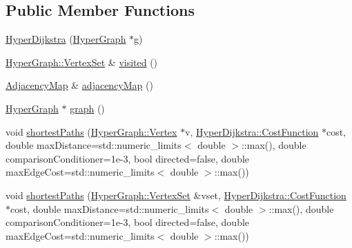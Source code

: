 \subsection*{Public Member Functions}
\begin{DoxyCompactItemize}
\item 
\mbox{\hyperlink{structg2o_1_1_hyper_dijkstra_a55e844f4b596290cb36a0d9fe4140966}{Hyper\+Dijkstra}} (\mbox{\hyperlink{classg2o_1_1_hyper_graph}{Hyper\+Graph}} $\ast$g)
\item 
\mbox{\hyperlink{classg2o_1_1_hyper_graph_a703938cdb4bb636860eed55a2489d70c}{Hyper\+Graph\+::\+Vertex\+Set}} \& \mbox{\hyperlink{structg2o_1_1_hyper_dijkstra_a2cb453ed6f1bf6069186bd269a6464da}{visited}} ()
\item 
\mbox{\hyperlink{structg2o_1_1_hyper_dijkstra_af12ff8eef95094815a3fa1da0514bda2}{Adjacency\+Map}} \& \mbox{\hyperlink{structg2o_1_1_hyper_dijkstra_ace002e09514a2eeb76a7b569f9e30f6c}{adjacency\+Map}} ()
\item 
\mbox{\hyperlink{classg2o_1_1_hyper_graph}{Hyper\+Graph}} $\ast$ \mbox{\hyperlink{structg2o_1_1_hyper_dijkstra_a578a9eb1874d9802dbd37a2f1681c196}{graph}} ()
\item 
void \mbox{\hyperlink{structg2o_1_1_hyper_dijkstra_ad88b79c73c8eaa5f1afbe27b778b542e}{shortest\+Paths}} (\mbox{\hyperlink{classg2o_1_1_hyper_graph_1_1_vertex}{Hyper\+Graph\+::\+Vertex}} $\ast$v, \mbox{\hyperlink{structg2o_1_1_hyper_dijkstra_1_1_cost_function}{Hyper\+Dijkstra\+::\+Cost\+Function}} $\ast$cost, double max\+Distance=std\+::numeric\+\_\+limits$<$ double $>$\+::max(), double comparison\+Conditioner=1e-\/3, bool directed=false, double max\+Edge\+Cost=std\+::numeric\+\_\+limits$<$ double $>$\+::max())
\item 
void \mbox{\hyperlink{structg2o_1_1_hyper_dijkstra_a00d978615ff1bbb9917351e9cba0b4ba}{shortest\+Paths}} (\mbox{\hyperlink{classg2o_1_1_hyper_graph_a703938cdb4bb636860eed55a2489d70c}{Hyper\+Graph\+::\+Vertex\+Set}} \&vset, \mbox{\hyperlink{structg2o_1_1_hyper_dijkstra_1_1_cost_function}{Hyper\+Dijkstra\+::\+Cost\+Function}} $\ast$cost, double max\+Distance=std\+::numeric\+\_\+limits$<$ double $>$\+::max(), double comparison\+Conditioner=1e-\/3, bool directed=false, double max\+Edge\+Cost=std\+::numeric\+\_\+limits$<$ double $>$\+::max())
\end{DoxyCompactItemize}
